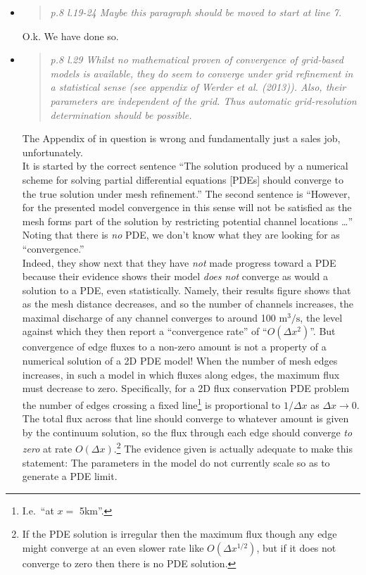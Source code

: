 \documentclass[11pt,reqno]{amsart}
\newcommand{\reply}[2]{
\medskip\medskip
\item  \begin{quote}
\emph{#1}
\end{quote}

\medskip
\noindent #2}
\begin{document}
\begin{itemize}
\reply{p.8 l.19-24 Maybe this paragraph should be moved to start at line 7.}
{O.k.  We have done so.}

\reply{p.8 l.29 Whilst no mathematical proven of convergence of grid-based models is available,  they do seem to converge under grid refinement in a statistical sense (see appendix of Werder et al. (2013)).  Also, their parameters are independent of the grid.  Thus automatic grid-resolution determination should be possible.}
{The Appendix of \cite{Werderetal2013} in question is wrong and fundamentally just a sales job, unfortunately. \\
\indent It is started by the correct sentence ``The solution produced by a numerical scheme for solving partial differential equations [PDEs] should converge to the true solution under mesh refinement.''  The second sentence is ``However, for the presented model convergence in this sense will not be satisfied as the mesh forms part of the solution by restricting potential channel locations \dots''  Noting that there is \emph{no} PDE, we don't know what they are looking for as ``convergence.''  \\
\indent Indeed, they show next that they have \emph{not} made progress toward a PDE because their evidence shows their model \emph{does not} converge as would a solution to a PDE, even statistically. Namely, their results figure shows that as the mesh distance decreases, and so the number of channels increases, the maximal discharge of any channel converges to around 100 $\text{m}^3/\text{s}$, the level against which they then report a ``convergence rate'' of ``$O(\Delta x^2)$''.  But convergence of edge fluxes to a non-zero amount is not a property of a numerical solution of a 2D PDE model! When the number of mesh edges increases, in such a model in which fluxes along edges, the maximum flux must decrease to zero.  Specifically, for a 2D flux conservation PDE problem the number of edges crossing a fixed line\footnote{I.e.~``at $x=$ 5km''.} is proportional to $1/\Delta x$ as $\Delta x\to 0$.  The total flux across that line should converge to whatever amount is given by the continuum solution, so the flux through each edge should converge \emph{to zero} at rate $O(\Delta x)$.\footnote{If the PDE solution is irregular then the maximum flux though any edge might converge at an even slower rate like $O(\Delta x^{1/2})$, but if it does not converge to zero then there is no PDE solution.}  The evidence given is actually adequate to make this statement: The parameters in the model do not currently scale so as to generate a PDE limit. \\
}
\end{itemize}
\end{document}
